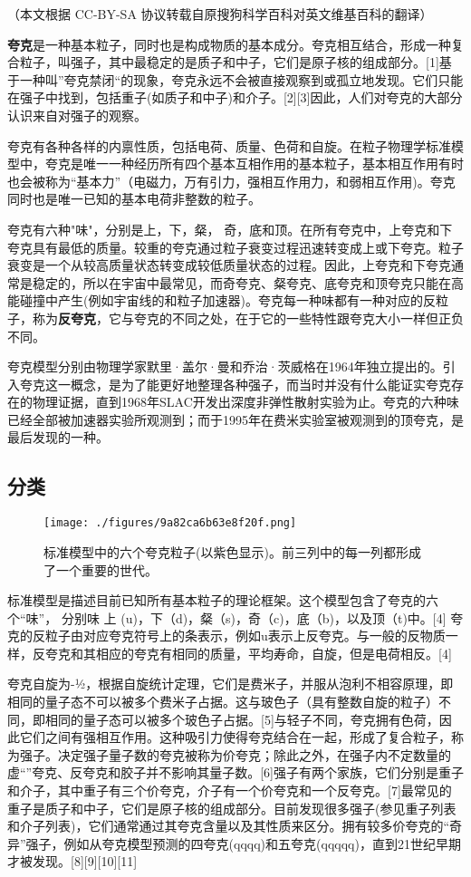 
（本文根据 CC-BY-SA 协议转载自原搜狗科学百科对英文维基百科的翻译）

\textbf{夸克}是一种基本粒子，同时也是构成物质的基本成分。夸克相互结合，形成一种复合粒子，叫强子，其中最稳定的是质子和中子，它们是原子核的组成部分。[1]基于一种叫”夸克禁闭“的现象，夸克永远不会被直接观察到或孤立地发现。它们只能在强子中找到，包括重子(如质子和中子)和介子。[2][3]因此，人们对夸克的大部分认识来自对强子的观察。

夸克有各种各样的内禀性质，包括电荷、质量、色荷和自旋。在粒子物理学标准模型中，夸克是唯一一种经历所有四个基本互相作用的基本粒子，基本相互作用有时也会被称为“基本力”（电磁力，万有引力，强相互作用力，和弱相互作用)。夸克同时也是唯一已知的基本电荷非整数的粒子。

夸克有六种"味"，分别是上，下，粲， 奇，底和顶。在所有夸克中，上夸克和下夸克具有最低的质量。较重的夸克通过粒子衰变过程迅速转变成上或下夸克。粒子衰变是一个从较高质量状态转变成较低质量状态的过程。因此，上夸克和下夸克通常是稳定的，所以在宇宙中最常见，而奇夸克、粲夸克、底夸克和顶夸克只能在高能碰撞中产生(例如宇宙线的和粒子加速器)。夸克每一种味都有一种对应的反粒子，称为\textbf{反夸克}，它与夸克的不同之处，在于它的一些特性跟夸克大小一样但正负不同。

夸克模型分别由物理学家默里·盖尔·曼和乔治·茨威格在1964年独立提出的。引入夸克这一概念，是为了能更好地整理各种强子，而当时并没有什么能证实夸克存在的物理证据，直到1968年SLAC开发出深度非弹性散射实验为止。夸克的六种味已经全部被加速器实验所观测到；而于1995年在费米实验室被观测到的顶夸克，是最后发现的一种。

\subsection{分类}
\begin{figure}[ht]
\centering
\texttt{[image: ./figures/9a82ca6b63e8f20f.png]}
\caption{标准模型中的六个夸克粒子(以紫色显示)。前三列中的每一列都形成了一个重要的世代。} \label{fig_Quark_1}
\end{figure}

标准模型是描述目前已知所有基本粒子的理论框架。这个模型包含了夸克的六个“味”， 分别味 上 (u)，下（d)，粲（s)，奇（c)，底（b)，以及顶（t)中。[4] 夸克的反粒子由对应夸克符号上的条表示，例如u表示上反夸克。与一般的反物质一样，反夸克和其相应的夸克有相同的质量，平均寿命，自旋，但是电荷相反。[4]

夸克自旋为-1⁄2，根据自旋统计定理，它们是费米子，并服从泡利不相容原理，即相同的量子态不可以被多个费米子占据。这与玻色子（具有整数自旋的粒子）不同，即相同的量子态可以被多个玻色子占据。[5]与轻子不同，夸克拥有色荷，因此它们之间有强相互作用。这种吸引力使得夸克结合在一起，形成了复合粒子，称为强子。决定强子量子数的夸克被称为价夸克；除此之外，在强子内不定数量的虚“”夸克、反夸克和胶子并不影响其量子数。[6]强子有两个家族，它们分别是重子和介子，其中重子有三个价夸克，介子有一个价夸克和一个反夸克。[7]最常见的重子是质子和中子，它们是原子核的组成部分。目前发现很多强子(参见重子列表和介子列表)，它们通常通过其夸克含量以及其性质来区分。拥有较多价夸克的“奇异”强子，例如从夸克模型预测的四夸克(qqqq)和五夸克(qqqqq)，直到21世纪早期才被发现。[8][9][10][11]

